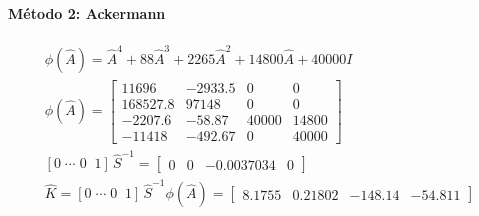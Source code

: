 \documentclass[11pt]{article}
\begin{document}
\paragraph{Método 2: Ackermann}
\begin{gather*}
\phi(\hat{A})=\hat{A}^{4} + 88\hat{A}^{3} + 2265\hat{A}^{2} + 14800\hat{A} + 40000I\\
\phi(\hat{A})=\begin{bmatrix}11696 & -2933.5 & 0 & 0 \\ 168527.8 & 97148 & 0 & 0 \\ -2207.6 & -58.87 & 40000 & 14800 \\ -11418 & -492.67 & 0 & 40000\end{bmatrix}\\
[0\;\cdots\;0\;\;1]\,\hat{S}^{-1}=\begin{bmatrix}0 & 0 & -0.0037034 & 0\end{bmatrix}\\
\hat{K}=[0\;\cdots\;0\;\;1]\,\hat{S}^{-1}\phi(\hat{A})=\begin{bmatrix}8.1755 & 0.21802 & -148.14 & -54.811\end{bmatrix}
\end{gather*}
\end{document}
